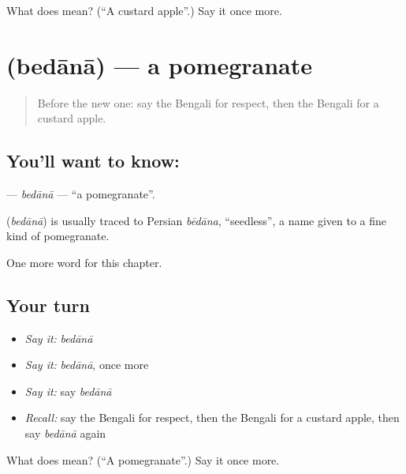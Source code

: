 \begin{tcolorbox}[breakable,colback=teal!4,colframe=teal!35!black,title={Before you move on}]
What does  mean? (\textquotedblleft{}A custard apple\textquotedblright{}.) Say it once more.
\end{tcolorbox}
\section[\texorpdfstring{\bn{বেদানা} (bedānā)}{বেদানা (bedānā)}]{ (bedānā) — a pomegranate}

\label{lesson:BN-C204-bedana}



\begin{quote}
Before the new one: say the Bengali for respect, then the Bengali for a custard apple.
\end{quote}

\subsection*{You'll want to know: }
\textbf{} — \emph{bedānā} — \textquotedblleft{}a pomegranate\textquotedblright{}.

\begin{cousinweb}
\textbf{} (\emph{bedānā}) is usually traced to Persian \emph{bēdāna}, \textquotedblleft{}seedless\textquotedblright{}, a name given to a fine kind of pomegranate.
\end{cousinweb}

\begin{grammarlens}[title={What you've built}]
One more word for this chapter.
\end{grammarlens}

\subsection*{Your turn}
\begin{itemize}
\raggedright
  \item \emph{Say it:} \emph{bedānā}
  \item \emph{Say it:} \emph{bedānā}, once more
  \item \emph{Say it:} say \emph{bedānā}
  \item \emph{Recall:} say the Bengali for respect, then the Bengali for a custard apple, then say \emph{bedānā} again
\end{itemize}

\begin{tcolorbox}[breakable,colback=teal!4,colframe=teal!35!black,title={Before you move on}]
What does  mean? (\textquotedblleft{}A pomegranate\textquotedblright{}.) Say it once more.
\end{tcolorbox}
